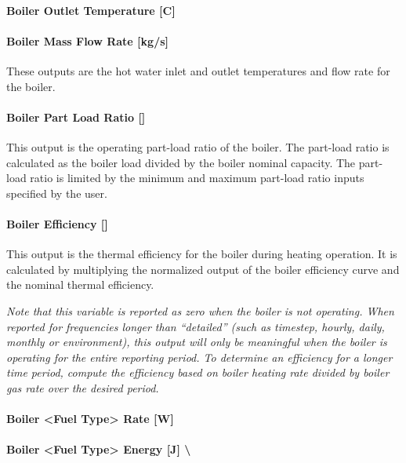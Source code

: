 \paragraph{Boiler Outlet Temperature {[}C{]}}\label{boiler-outlet-temperature-c}

\paragraph{Boiler Mass Flow Rate {[}kg/s{]}}\label{boiler-mass-flow-rate-kgs}

These outputs are the hot water inlet and outlet temperatures and flow rate for the boiler.

\paragraph{Boiler Part Load Ratio {[]}}\label{boiler-part-load-ratio}

This output is the operating part-load ratio of the boiler. The part-load ratio is calculated as the boiler load divided by the boiler nominal capacity. The part-load ratio is limited by the minimum and maximum part-load ratio inputs specified by the user.

\paragraph{Boiler Efficiency {[]}}\label{boiler-efficiency}

This output is the thermal efficiency for the boiler during heating operation. It is calculated by multiplying the normalized output of the boiler efficiency curve and the nominal thermal efficiency.

\emph{Note that this variable is reported as zero when the boiler is not operating. When reported for frequencies longer than ``detailed'' (such as timestep, hourly, daily, monthly or environment), this output will only be meaningful when the boiler is operating for the entire reporting period. To determine an efficiency for a longer time period, compute the efficiency based on boiler heating rate divided by boiler gas rate over the desired period.}

\paragraph{Boiler \textless{}Fuel Type\textgreater{} Rate {[}W{]}}\label{boiler-fuel-type-rate-w}

\paragraph{Boiler \textless{}Fuel Type\textgreater{} Energy {[}J{]} \textbackslash{}}\label{boiler-fuel-type-energy-j}

